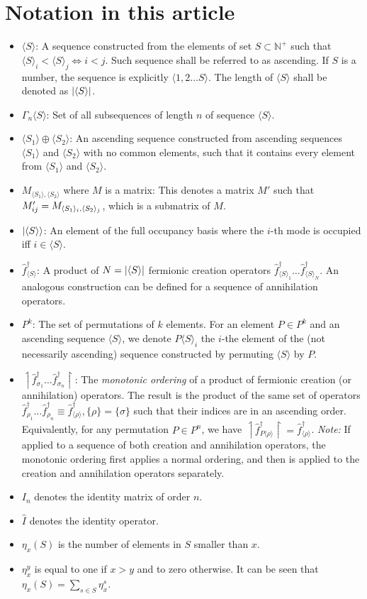\documentclass[12pt]{article}
\newcommand{\seq}[1]{\langle #1\rangle}
\newcommand{\asc}[1]{\upharpoonleft #1 \upharpoonright}
\newcommand{\hc}{^\dagger}
\begin{document}
	\appendix
	
	\section{Notation in this article}
	\begin{itemize}
		\item $\seq{S}$: A sequence constructed from the elements of set $S\subset \mathbb{N}^+$ such that\\ $\seq{S}_i< \seq{S}_j\iff i<j$. Such sequence shall be referred to as ascending. If $S$ is a number, the sequence is explicitly $\seq{1, 2\dots S}$. The length of $\seq{S}$ shall be denoted as $\abs{\seq{S}}$.
		\item $\Gamma_n\seq{S}$: Set of all subsequences of length $n$ of sequence $\seq{S}$.
		\item $\seq{S_1}\oplus\seq{S_2}$: An ascending sequence constructed from ascending sequences $\seq{S_1}$ and $\seq{S_2}$ with no common elements, such that it contains every element from $\seq{S_1}$ and $\seq{S_2}$.
		\item $M_{\seq{S_1},\seq{S_2}}$ where $M$ is a matrix: This denotes a matrix $M'$ such that $M'_{ij}=\nolinebreak M_{\seq{S_1}_i,\seq{S_2}_j}$, which is a submatrix of $M$.
		\item $\ket{\seq{S}}$: An element of the full occupancy basis where the $i$-th mode is occupied iff $i\in\seq{S}$.
		\item $\hat{f}\hc_{\seq{S}}$: A product of $N=\abs{\seq{S}}$ fermionic creation operators $\hat{f}\hc_{\seq{S}_1}\dots \hat{f}\hc_{\seq{S}_N}$. An analogous construction can be defined for a sequence of annihilation operators.
		\item $P^k$: The set of permutations of $k$ elements. For an element $P\in P^k$ and an ascending sequence $\seq{S}$, we denote $P\seq{S}_i$ the $i$-the element of the (not necessarily ascending) sequence constructed by permuting $\seq{S}$ by $P$.
		\item $\asc{\hat{f}\hc_{\sigma_1}\dots\hat{f}\hc_{\sigma_n}}$: The \textit{monotonic ordering} of a product of fermionic creation (or annihilation) operators. The result is the product of the same set of operators $\hat{f}\hc_{\rho_1}\dots\hat{f}\hc_{\rho_n}\equiv \hat{f}\hc_{\seq{\rho}}, \{\rho\}=\{\sigma\}$ such that their indices are in an ascending order. Equivalently, for any permutation $P\in P^n$, we have $\asc{\hat{f}\hc_{P\seq{\rho}}}=\hat{f}\hc_{\seq{\rho}}$. \textit{Note:} If applied to a sequence of both creation and annihilation operators, the monotonic ordering first applies a normal ordering, and then is applied to the creation and annihilation operators separately.
		\item $I_n$ denotes the identity matrix of order $n$.
		\item $\hat{I}$ denotes the identity operator.
		\item $\eta_x(S)$ is the number of elements in $S$ smaller than $x$.
		\item $\eta_x^y$ is equal to one if $x>y$ and to zero otherwise. It can be seen that $\eta_x(S)=\sum_{s\in S}\eta_x^s$.
	\end{itemize}
	
\end{document}
